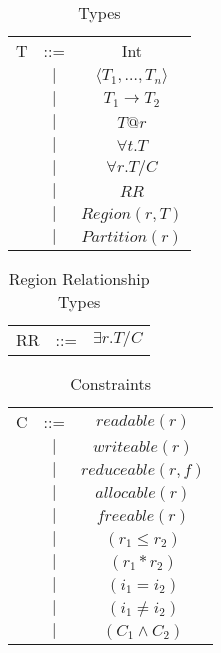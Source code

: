 \documentclass{article}
\begin{document}
\begin{table*}
\centering
{\small
\begin{tabular}{ccc}

T & ::= & Int \\
  &$\mid$&$\langle T_1, \ldots, T_n \rangle$ \\
  &$\mid$&$T_1 \rightarrow T_2$ \\
  &$\mid$&$T@r$\\
  &$\mid$&$\forall t.T$ \\
  &$\mid$&$\forall r.T/C$ \\
  &$\mid$&$RR$ \\
  &$\mid$&$Region(r,T)$ \\
  &$\mid$&$Partition(r)$ \\

\end{tabular}
}
\caption{Types}
\end{table*}

\begin{table*}
\centering
{\small
\begin{tabular}{ccc}
RR & ::= & $\exists r.T/C$ \\
\end{tabular}
}
\caption{Region Relationship Types}
\end{table*}



\begin{table*}
\centering
{\small
\begin{tabular}{ccc}

C & ::= & $readable(r)$ \\
  &$\mid$&$writeable(r)$ \\
  &$\mid$&$reduceable(r,f)$ \\
  &$\mid$&$allocable(r)$ \\
  &$\mid$&$freeable(r)$ \\
  &$\mid$&$(r_1 \le r_2)$ \\
  &$\mid$&$(r_1 * r_2)$ \\
  &$\mid$&$(i_1 = i_2)$ \\
  &$\mid$&$(i_1 \ne i_2)$ \\
  &$\mid$&$(C_1 \wedge C_2)$ \\
\end{tabular}
}
\caption{Constraints}
\end{table*}
\end{document}
